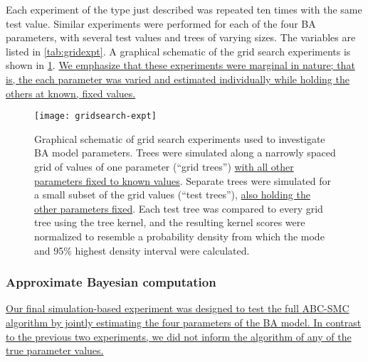 Each experiment of the type just described was repeated ten times with the same
test value. Similar experiments were performed for each of the four \gls{BA}
parameters, with several test values and trees of varying sizes. The variables
are listed in \cref{tab:gridexpt}. A graphical schematic of the grid search
experiments is shown in \cref{fig:gridexpt}. {\color{blue}\uline{We emphasize
that these experiments were marginal in nature; that is, the each parameter was
varied and estimated individually while holding the others at known, fixed
values.}}


\begin{figure}[ht]
  \centering
  \texttt{[image: gridsearch-expt]}
  \caption[Schematic of grid search experiment.]{
    Graphical schematic of grid search experiments used to investigate \gls{BA}
    model parameters. Trees were simulated along a narrowly spaced grid of
    values of one parameter (``grid trees'') {\color{blue}\uline{with all other
    parameters fixed to known values}}. Separate trees were simulated for a
    small subset of the grid values (``test trees''), {\color{blue}\uline{also
    holding the other parameters fixed}}. Each test tree was
    compared to every grid tree using the tree kernel, and the resulting kernel
    scores were normalized to resemble a probability density from which the
    mode and 95\% highest density interval were calculated.
  }
  \label{fig:gridexpt}
\end{figure}

\subsubsection*{Approximate Bayesian computation}

{\color{blue}\uline{
Our final simulation-based experiment was designed to test the full
\gls{ABC}-\gls{SMC} algorithm by jointly estimating the four parameters of the
\gls{BA} model. In contrast to the previous two experiments, we did not inform
the algorithm of any of the true parameter values.  }}

